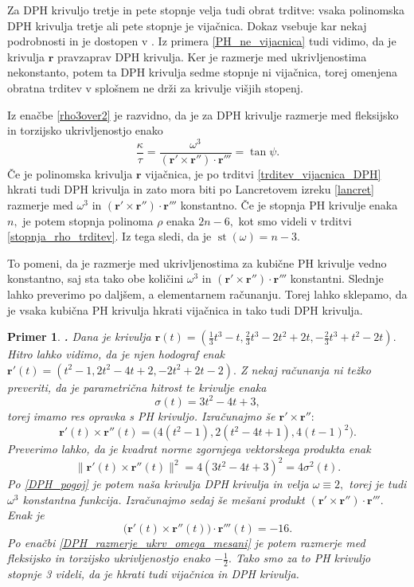 \documentclass[12pt,a4paper,twoside]{article}
\theoremstyle{definition} %
\theoremstyle{plain} %
\theoremstyle{primerstyle}
\newtheorem{primer}[definicija]{Primer}
\numberwithin{equation}{section}  %
\newcommand{\rV}{\mathbf{r}}
\DeclareMathOperator{\st}{st}
\begin{document}
Za DPH krivuljo tretje in pete stopnje velja tudi obrat trditve: vsaka polinomska DPH krivulja tretje ali pete stopnje je vijačnica. Dokaz vsebuje kar nekaj podrobnosti in je dostopen v \cite{beltranmonterde}. Iz primera \ref{PH_ne_vijacnica} tudi vidimo, da je krivulja $\rV$ pravzaprav DPH krivulja. Ker je razmerje med ukrivljenostima nekonstanto, potem ta DPH krivulja sedme stopnje ni vijačnica, torej omenjena obratna trditev v splošnem ne drži za krivulje višjih stopenj.

Iz enačbe \eqref{rho3over2} je razvidno, da je za DPH krivulje razmerje med fleksijsko in torzijsko ukrivljenostjo enako
\begin{equation}
	\label{DPH_razmerje_ukrv_omega_mesani}
	\frac{\kappa}{\tau}=\frac{\omega^3}{(\rV'\times\rV'')\cdot\rV'''}=\tan\psi.
\end{equation}
Če je polinomska krivulja $\rV$ vijačnica, je po trditvi \ref{trditev_vijacnica_DPH} hkrati tudi DPH krivulja in zato mora biti po Lancretovem izreku \ref{lancret} razmerje med $\omega^3$ in $(\rV'\times\rV'')\cdot\rV'''$ konstantno. Če je stopnja PH krivulje enaka $n,$ je potem stopnja polinoma $\rho	$ enaka $2n-6,$ kot smo videli v trditvi \ref{stopnja_rho_trditev}. Iz tega sledi, da je $\st(\omega)=n-3.$

To pomeni, da je razmerje med ukrivljenostima za kubične PH krivulje vedno konstantno, saj sta tako obe količini $\omega^3$ in $(\rV'\times\rV'')\cdot\rV'''$ konstantni. Slednje lahko preverimo po daljšem, a elementarnem računanju. Torej lahko sklepamo, da je vsaka kubična PH krivulja hkrati vijačnica in tako tudi DPH krivulja.
\begin{primer}
	\textbf{.} Dana je krivulja $\rV(t)=(\frac{1}{3}t^3-t,\frac{2}{3}t^3-2t^2+2t,-\frac{2}{3}t^3+t^2-2t).$ Hitro lahko vidimo, da je njen hodograf enak $\rV'(t)=(t^2-1,2t^2-4t+2,-2t^2+2t-2).$ Z nekaj računanja ni težko preveriti, da je parametrična hitrost te krivulje enaka
	$$\sigma(t)=3t^2-4t+3,$$
	torej imamo res opravka s PH krivuljo. Izračunajmo še $\rV'\times\rV'':$
	$$\rV'(t)\times\rV''(t)=\big(4(t^2-1),2(t^2-4t+1),4(t-1)^2\big).$$
	Preverimo lahko, da je kvadrat norme zgornjega vektorskega produkta enak
	$$\lVert\rV'(t)\times\rV''(t)\rVert^2=4(3t^2-4t+3)^2=4\sigma^2(t).$$
	Po \eqref{DPH_pogoj} je potem naša krivulja DPH krivulja in velja $\omega\equiv2,$ torej je tudi $\omega^3$ konstantna funkcija. Izračunajmo sedaj še mešani produkt $(\rV'\times\rV'')\cdot\rV'''.$ Enak je
	$$\big(\rV'(t)\times\rV''(t)\big)\cdot\rV'''(t)=-16.$$
	Po enačbi \eqref{DPH_razmerje_ukrv_omega_mesani} je potem razmerje med fleksijsko in torzijsko ukrivljenostjo enako $-\frac{1}{2}.$ Tako smo za to PH krivuljo stopnje 3 videli, da je hkrati tudi vijačnica in DPH krivulja.
\end{primer}
\end{document}
